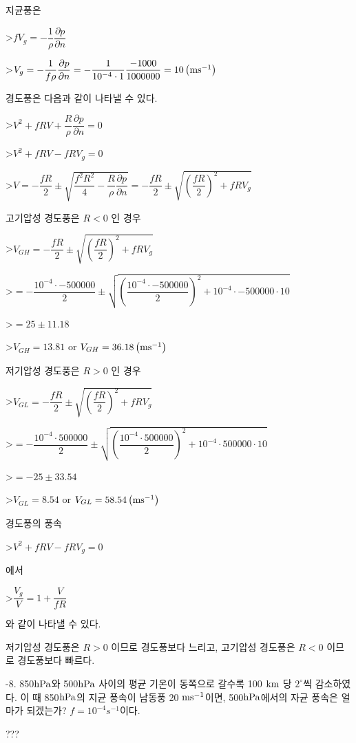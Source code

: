 지균풍은 

>$f V_{g} = -\dfrac{1}{\rho}\dfrac{\partial p}{\partial n}$ 

>$V_{g} = -\dfrac{1}{f \rho}\dfrac{\partial p}{\partial n} =  -\dfrac{1}{10^{-4} \cdot 1}\dfrac{-1000}{1000000} = 10 \left( \rm m s^{-1} \right)$ 

경도풍은 다음과 같이 나타낼 수 있다.

>$ V^{2} + fRV + \dfrac{R}{\rho} \dfrac{\partial p}{\partial n} = 0$

>$ V^{2} + fRV - f R V_{g} = 0$

>$ V = -\dfrac{fR}{2} \pm \sqrt{ \dfrac{f^{2} R^{2}}{4} - \dfrac{R}{\rho}\dfrac{\partial p}{\partial n} } = -\dfrac{fR}{2} \pm \sqrt{ {\left(\dfrac{f R}{2} \right)}^{2} + f R V_{g} }$

고기압성 경도풍은 $ R < 0$ 인 경우

>$ V_{GH} = -\dfrac{fR}{2} \pm \sqrt{ {\left(\dfrac{f R}{2} \right)}^{2} + f R V_{g} }$

>$= -\dfrac{10^{-4} \cdot -500000}{2} \pm \sqrt{ {\left(\dfrac{10^{-4} \cdot -500000}{2} \right)}^{2} + 10^{-4} \cdot -500000 \cdot 10 }$

>$= 25 \pm 11.18 $

>$V_{GH} =13.81 $ or $V_{GH} = 36.18 \left( \rm m s^{-1} \right)$

저기압성 경도풍은  $ R > 0$ 인 경우

>$ V_{GL} = -\dfrac{fR}{2} \pm \sqrt{ {\left(\dfrac{f R}{2} \right)}^{2} + f R V_{g} }$

>$= -\dfrac{10^{-4} \cdot 500000}{2} \pm \sqrt{ {\left(\dfrac{10^{-4} \cdot 500000}{2} \right)}^{2} + 10^{-4} \cdot 500000 \cdot 10 }$

>$= -25 \pm 33.54 $

>$V_{GL} =8.54 $ or $V_{GL} = 58.54 \left( \rm m s^{-1} \right)$


경도풍의 풍속

>$ V^{2} + fRV - f R V_{g} = 0$

에서 

>$ \dfrac{V_{g}}{V} = 1 + \dfrac{V}{fR}$

와 같이 나타낼 수 있다. 

저기압성 경도풍은  $ R > 0$ 이므로 경도풍보다 느리고, 고기압성 경도풍은  $ R < 0$ 이므로 경도풍보다 빠르다.


-8. 850$\rm hPa$와  500$\rm hPa$ 사이의 평균 기온이 동쪽으로 갈수록 100 $\rm km$ 당  $2^{\circ}$씩 감소하였다. 이 때 850$\rm hPa$의 지균 풍속이 남동풍 20 $\rm m s^{-1}$이면, 500$\rm hPa$에서의 자균 풍속은 얼마가 되겠는가? $ f = 10^{-4} s^{-1}$이다. 


???























